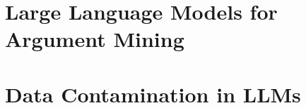 \section{Large Language Models for Argument Mining}
\label{sec:llms_am}


\section{Data Contamination in LLMs}
\label{sec:contamination}

